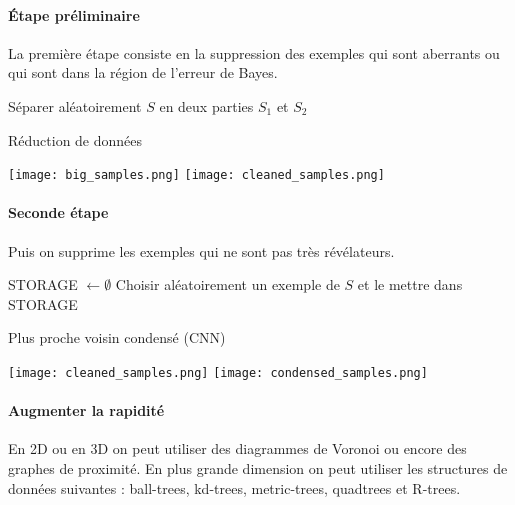 \paragraph{Étape préliminaire}
La première étape consiste en la suppression des exemples qui sont aberrants ou qui sont dans la région de l'erreur de Bayes.
\begin{center}
	\begin{algorithm}[H]
		Séparer aléatoirement $S$ en deux parties $S_1$ et $S_2$\;
		\caption{Réduction de données}
	\end{algorithm}
	
	\texttt{[image: big\_samples.png]}
	\texttt{[image: cleaned\_samples.png]}
\end{center}

\paragraph{Seconde étape}
Puis on supprime les exemples qui ne sont pas très révélateurs.
\begin{center}
	\begin{algorithm}[H]
		STORAGE $\gets \emptyset$\; 
		Choisir aléatoirement un exemple de $S$ et le mettre dans STORAGE\;
		\caption{Plus proche voisin condensé (CNN)}
	\end{algorithm}
	
	\texttt{[image: cleaned\_samples.png]}
	\texttt{[image: condensed\_samples.png]}
\end{center}

\paragraph{Augmenter la rapidité}
En 2D ou en 3D on peut utiliser des diagrammes de Voronoi ou encore des graphes de proximité.
En plus grande dimension on peut utiliser les structures de données suivantes : ball-trees, kd-trees, metric-trees, quadtrees et R-trees.

